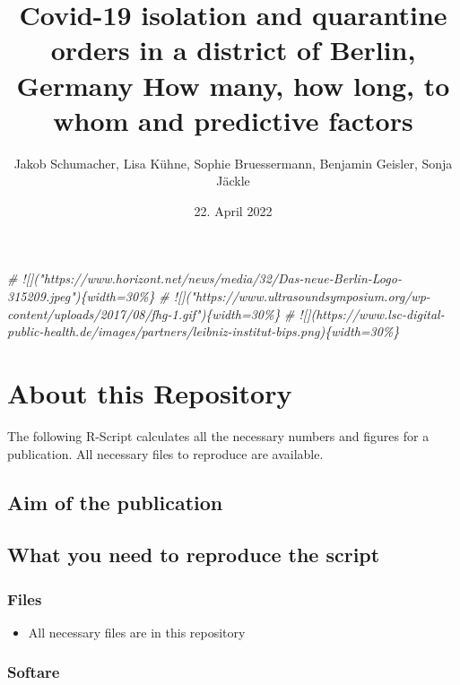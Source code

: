 \documentclass[
]{article}
\title{Covid-19 isolation and quarantine orders in a district of Berlin,
Germany How many, how long, to whom and predictive factors}
\author{Jakob Schumacher, Lisa Kühne, Sophie Bruessermann, Benjamin
Geisler, Sonja Jäckle}
\date{22. April 2022}
\newenvironment{Shaded}{\begin{snugshade}}{\end{snugshade}}
\newcommand{\CommentTok}[1]{\textcolor[rgb]{0.56,0.35,0.01}{\textit{#1}}}
\providecommand{\tightlist}{%
  \setlength{\itemsep}{0pt}\setlength{\parskip}{0pt}}
\begin{document}
\maketitle

\begin{Shaded}
\begin{Highlighting}[]
\CommentTok{\# ![]("https://www.horizont.net/news/media/32/Das{-}neue{-}Berlin{-}Logo{-}315209.jpeg")\{width=30\%\}}
\CommentTok{\# ![]("https://www.ultrasoundsymposium.org/wp{-}content/uploads/2017/08/fhg{-}1.gif")\{width=30\%\}}
\CommentTok{\# ![](https://www.lsc{-}digital{-}public{-}health.de/images/partners/leibniz{-}institut{-}bips.png)\{width=30\%\}}
\end{Highlighting}
\end{Shaded}

\hypertarget{about-this-repository}{%
\section{About this Repository}\label{about-this-repository}}

The following R-Script calculates all the necessary numbers and figures
for a publication. All necessary files to reproduce are available.

\hypertarget{aim-of-the-publication}{%
\subsection{Aim of the publication}\label{aim-of-the-publication}}

\hypertarget{what-you-need-to-reproduce-the-script}{%
\subsection{What you need to reproduce the
script}\label{what-you-need-to-reproduce-the-script}}

\hypertarget{files}{%
\subsubsection{Files}\label{files}}

\begin{itemize}
\tightlist
\item
  All necessary files are in this repository
\end{itemize}

\hypertarget{softare}{%
\subsubsection{Softare}\label{softare}}
\end{document}
